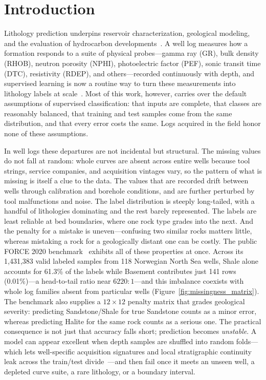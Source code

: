 \documentclass[bdcc,article,submit,pdftex,moreauthors]{Definitions/mdpi}
\begin{document}
\sloppy

\section{Introduction}
\label{sec:intro}
Lithology prediction underpins reservoir characterization, geological modeling, and the
evaluation of hydrocarbon developments~\cite{rider2011,ellis2007,doveton2014}. A well log
measures how a formation responds to a suite of physical probes---gamma ray (GR), bulk density
(RHOB), neutron porosity (NPHI), photoelectric factor (PEF), sonic transit time (DTC),
resistivity (RDEP), and others---recorded continuously with depth, and supervised learning is
now a routine way to turn these measurements into lithology labels at
scale~\cite{hall2016facies,merembayev2021,dev2019formation,carvalho2026benchmark}. Most of
this work, however, carries over the default assumptions of supervised classification: that
inputs are complete, that classes are reasonably balanced, that training and test samples come
from the same distribution, and that every error costs the same. Logs acquired in the field
honor none of these assumptions.

In well logs these departures are not incidental but structural. The missing values do not
fall at random: whole curves are absent across entire wells because tool strings, service
companies, and acquisition vintages vary, so the pattern of what is missing is itself a clue
to the data. The values that are recorded drift between wells through calibration and borehole
conditions, and are further perturbed by tool malfunctions and noise. The label distribution
is steeply long-tailed, with a handful of lithologies dominating and the rest barely
represented. The labels are least reliable at bed boundaries, where one rock type grades into
the next. And the penalty for a mistake is uneven---confusing two similar rocks matters
little, whereas mistaking a rock for a geologically distant one can be costly. The public
FORCE 2020 benchmark~\cite{bormann2020force} exhibits all of these properties at once. Across
its 1{,}431{,}383 valid labeled samples from 118 Norwegian North Sea wells, Shale alone
accounts for 61.3\% of the labels while Basement contributes just 141 rows (0.01\%)---a
head-to-tail ratio near $6220{:}1$---and this imbalance coexists with whole log families
absent from particular wells (Figure~\ref{fig:missingness_matrix}). The benchmark also
supplies a $12{\times}12$ penalty matrix that grades geological severity: predicting
Sandstone/Shale for true Sandstone counts as a minor error, whereas predicting Halite for the
same rock counts as a serious one. The practical consequence is not just that accuracy falls
short; prediction becomes \emph{unstable}. A model can appear excellent when depth samples are
shuffled into random folds---which lets well-specific acquisition signatures and local
stratigraphic continuity leak across the train/test divide~\cite{rosenblatt2024,roberts2017cv,mila2022nndm}---and
then fail once it meets an unseen well, a depleted curve suite, a rare lithology, or a boundary
interval.
\end{document}
